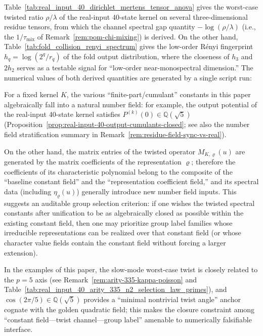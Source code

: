 \begin{remark}\label{rem:spec-gap-numeric-anchors}
Table~\ref{tab:real_input_40_dirichlet_mertens_tensor_anova} gives the worst-case twisted ratio \(\rho/\lambda\) of the real-input 40-state kernel on several three-dimensional residue tensors,
from which the channel spectral gap quantity \(-\log(\rho/\lambda)\) (i.e., the \(1/\tau_{\mathrm{mix}}\) of Remark~\ref{rem:pom-chi-mixing}) is derived.
On the other hand, Table~\ref{tab:fold_collision_renyi_spectrum} gives the low-order R\'enyi fingerprint \(h_q=\log(2^q/r_q)\) of the fold output distribution,
where the closeness of \(h_3\) and \(2h_2\) serves as a testable signal for ``low-order near-monospectral dimension.''
The numerical values of both derived quantities are generated by a single script run:

\end{remark}

\begin{remark}\label{rem:character-field-matching}
For a fixed kernel \(K\), the various ``finite-part/cumulant'' constants in this paper algebraically fall into a natural number field:
for example, the output potential of the real-input 40-state kernel satisfies \(P^{(k)}(0)\in\mathbb{Q}(\sqrt5)\)
(Proposition~\ref{prop:real-input-40-output-cumulants-closed}; see also the number field stratification summary in Remark~\ref{rem:residue-field-sync-vs-real}).
\par
On the other hand, the matrix entries of the twisted operator \(M_{K,\varrho}(u)\) are generated by the matrix coefficients of the representation \(\varrho\);
therefore the coefficients of its characteristic polynomial belong to the composite of the ``baseline constant field'' and the ``representation coefficient field,'' and its spectral data (including \(\eta_{\varrho}(u)\)) generally introduce new number field inputs.
This suggests an auditable group selection criterion: if one wishes the twisted spectral constants after unification to be as algebraically closed as possible within the existing constant field,
then one may prioritize group label families whose irreducible representations can be realized over that constant field (or whose character value fields contain the constant field without forcing a larger extension).
\par
In the examples of this paper, the slow-mode worst-case twist is closely related to the \(p=5\) axis (see Remark~\ref{rem:arity-335-kappa-poisson} and Table~\ref{tab:real_input_40_arity_335_n2_selection_law_primes}),
and \(\cos(2\pi/5)\in\mathbb{Q}(\sqrt5)\) provides a ``minimal nontrivial twist angle'' anchor cognate with the golden quadratic field;
this makes the closure constraint among ``constant field---twist channel---group label'' amenable to numerically falsifiable interface.
\end{remark}

